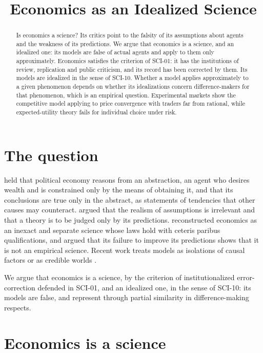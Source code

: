 \documentclass{situationist-preprint}
\title{Economics as an Idealized Science}
\begin{document}
\maketitle

\begin{abstract}
Is economics a science? Its critics point to the falsity of its assumptions about agents and the weakness of its predictions. We argue that economics is a science, and an idealized one: its models are false of actual agents and apply to them only approximately. Economics satisfies the criterion of SCI-01: it has the institutions of review, replication and public criticism, and its record has been corrected by them. Its models are idealized in the sense of SCI-10. Whether a model applies approximately to a given phenomenon depends on whether its idealizations concern difference-makers for that phenomenon, which is an empirical question. Experimental markets show the competitive model applying to price convergence with traders far from rational, while expected-utility theory fails for individual choice under risk.
\end{abstract}

\section{The question}

\citet{Mill1844} held that political economy reasons from an abstraction, an agent who desires wealth and is constrained only by the means of obtaining it, and that its conclusions are true only in the abstract, as statements of tendencies that other causes may counteract. \citet{Friedman1953} argued that the realism of assumptions is irrelevant and that a theory is to be judged only by its predictions. \citet{Hausman1992} reconstructed economics as an inexact and separate science whose laws hold with ceteris paribus qualifications, and \citet{Rosenberg1992} argued that its failure to improve its predictions shows that it is not an empirical science. Recent work treats models as isolations of causal factors \citep{Maki2009} or as credible worlds \citep{Sugden2000}.

We argue that economics is a science, by the criterion of institutionalized error-correction defended in SCI-01, and an idealized one, in the sense of SCI-10: its models are false, and represent through partial similarity in difference-making respects.

\section{Economics is a science}
\end{document}
